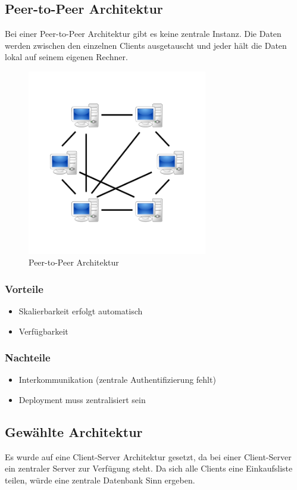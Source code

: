 \subsection{Peer-to-Peer Architektur}
Bei einer Peer-to-Peer Architektur gibt es keine zentrale Instanz. Die Daten werden zwischen den einzelnen Clients ausgetauscht und jeder hält die Daten lokal auf seinem eigenen Rechner.

\begin{figure}[htbp] 
	\centering
	\includegraphics[width=0.7\textwidth]{images/p2p.PNG}
	\caption{Peer-to-Peer Architektur}
	\label{fig:Bild2}
\end{figure}

\subsubsection{Vorteile}
\begin{itemize}
	\item Skalierbarkeit erfolgt automatisch
	\item Verfügbarkeit
\end{itemize}
\subsubsection{Nachteile}
\begin{itemize}
	\item Interkommunikation (zentrale Authentifizierung fehlt)
	\item Deployment muss zentralisiert sein
	
\end{itemize}
\subsection{Gewählte Architektur}
Es wurde auf eine Client-Server Architektur gesetzt, da bei einer Client-Server ein zentraler Server zur Verfügung steht. Da sich alle Clients eine Einkaufsliste teilen, würde eine zentrale Datenbank Sinn ergeben.

